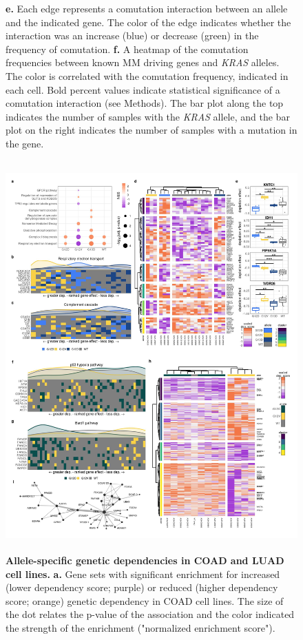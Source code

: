 \documentclass[english, 10pt, letterpaper]{article}
\newcommand{\KRAS}{\emph{KRAS}}
\begin{document}
\begin{figure}[p]
{    \textbf{e.} Each edge represents a comutation interaction between an allele and the indicated gene. The color of the edge indicates whether the interaction was an increase (blue) or decrease (green) in the frequency of comutation.
    \textbf{f.} A heatmap of the comutation frequencies between known MM driving genes and \KRAS{} alleles. The color is correlated with the comutation frequency, indicated in each cell. Bold percent values indicate statistical significance of a comutation interaction (see Methods). The bar plot along the top indicates the number of samples with the \KRAS{} allele, and the bar plot on the right indicates the number of samples with a mutation in the gene.
}
\label{fig:luadmm-comutation-main}
\end{figure}


\begin{figure}[p]
\centering
\includegraphics[height=150mm]{figures/Fig_4.jpeg}
\caption{
    \textbf{Allele-specific genetic dependencies in COAD and LUAD cell lines.}
    \textbf{a.} Gene sets with significant enrichment for increased (lower dependency score; purple) or reduced (higher dependency score; orange) genetic dependency in COAD cell lines. The size of the dot relates the p-value of the association and the color indicated the strength of the enrichment ("normalized enrichment score").
}
\end{figure}
\end{document}
